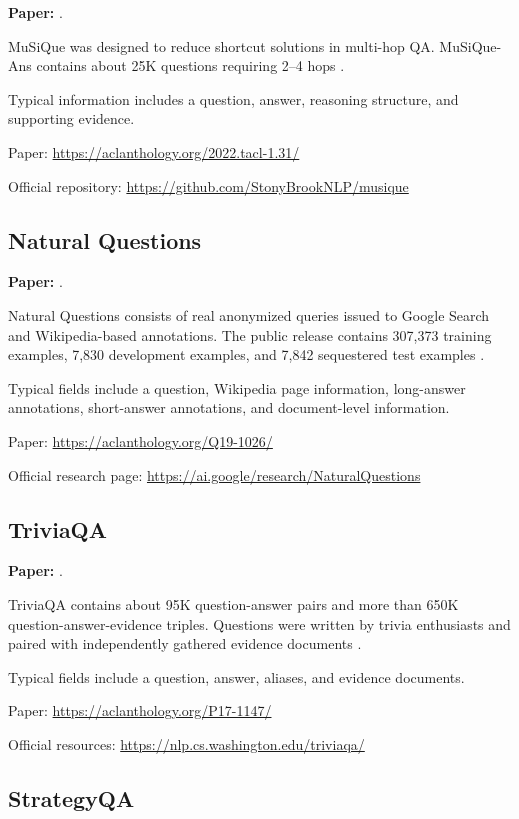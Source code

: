 \documentclass[11pt,a4paper]{article}
\begin{document}
\textbf{Paper:} \citet{trivedi-etal-2022-musique}.

MuSiQue was designed to reduce shortcut solutions in multi-hop QA. MuSiQue-Ans contains about 25K questions requiring 2--4 hops \citep{trivedi-etal-2022-musique}.

Typical information includes a question, answer, reasoning structure, and supporting evidence.

Paper:
\url{https://aclanthology.org/2022.tacl-1.31/}

Official repository:
\url{https://github.com/StonyBrookNLP/musique}

\subsection{Natural Questions}

\textbf{Paper:} \citet{kwiatkowski-etal-2019-natural}.

Natural Questions consists of real anonymized queries issued to Google Search and Wikipedia-based annotations. The public release contains 307,373 training examples, 7,830 development examples, and 7,842 sequestered test examples \citep{kwiatkowski-etal-2019-natural}.

Typical fields include a question, Wikipedia page information, long-answer annotations, short-answer annotations, and document-level information.

Paper:
\url{https://aclanthology.org/Q19-1026/}

Official research page:
\url{https://ai.google/research/NaturalQuestions}

\subsection{TriviaQA}

\textbf{Paper:} \citet{joshi-etal-2017-triviaqa}.

TriviaQA contains about 95K question-answer pairs and more than 650K question-answer-evidence triples. Questions were written by trivia enthusiasts and paired with independently gathered evidence documents \citep{joshi-etal-2017-triviaqa}.

Typical fields include a question, answer, aliases, and evidence documents.

Paper:
\url{https://aclanthology.org/P17-1147/}

Official resources:
\url{https://nlp.cs.washington.edu/triviaqa/}

\subsection{StrategyQA}
\end{document}

